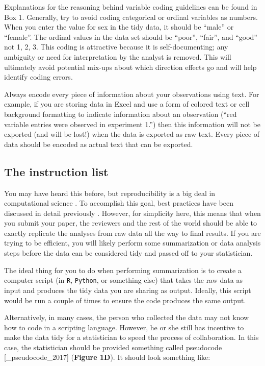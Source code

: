 \documentclass[12pt]{article}
\begin{document}
Explanations for the reasoning behind variable coding guidelines can be
found in Box 1. Generally, try to avoid coding categorical or ordinal
variables as numbers. When you enter the value for sex in the tidy data,
it should be ``male'' or ``female''. The ordinal values in the data set
should be ``poor'', ``fair'', and ``good'' not 1, 2, 3. This coding is
attractive because it is self-documenting; any ambiguity or need for
interpretation by the analyst is removed. This will ultimately avoid
potential mix-ups about which direction effects go and will help
identify coding errors.

Always encode every piece of information about your observations using
text. For example, if you are storing data in Excel and use a form of
colored text or cell background formatting to indicate information about
an observation (``red variable entries were observed in experiment 1.'')
then this information will not be exported (and will be lost!) when the
data is exported as raw text. Every piece of data should be encoded as
actual text that can be exported.

\subsection{The instruction list}\label{the-instruction-list}

You may have heard this before, but reproducibility is a big deal in
computational science \citep{peng_reproducible_2011}. To accomplish this
goal, best practices have been discussed in detail previously
\citep{wilson_good_2016}. However, for simplicity here, this means that
when you submit your paper, the reviewers and the rest of the world
should be able to exactly replicate the analyses from raw data all the
way to final results. If you are trying to be efficient, you will likely
perform some summarization or data analysis steps before the data can be
considered tidy and passed off to your statistician.

The ideal thing for you to do when performing summarization is to create
a computer script (in \texttt{R}, \texttt{Python}, or something else)
that takes the raw data as input and produces the tidy data you are
sharing as output. Ideally, this script would be run a couple of times
to ensure the code produces the same output.

Alternatively, in many cases, the person who collected the data may not
know how to code in a scripting language. However, he or she still has
incentive to make the data tidy for a statistician to speed the process
of collaboration. In this case, the statistician should be provided
something called pseudocode {[}\_pseudocode\_2017{]} (\textbf{Figure
1D}). It should look something like:
\end{document}
